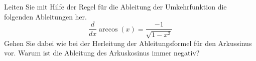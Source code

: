 \begin{ExerciseBlock}
Leiten Sie mit Hilfe der Regel für die Ableitung der Umkehrfunktion die folgenden Ableitungen her.
\begin{equation*}
	\frac{d}{dx} \arccos(x) = \frac{-1}{\sqrt{1-x^2}}
\end{equation*}
Gehen Sie dabei wie bei der Herleitung der Ableitungsformel für den Arkussinus vor. Warum ist die Ableitung des Arkuskosinus immer negativ?

\end{ExerciseBlock}
